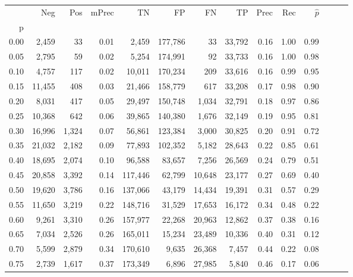 \begin{tabular}{rrrrrrrrrrrrrr}
\toprule
{} &     Neg &    Pos & mPrec &       TN &       FP &      FN &      TP &  Prec &   Rec & $\hat{p}$ \\
p    &         &        &       &          &          &         &         &       &       &           \\
\midrule
0.00 &   2,459 &     33 &  0.01 &    2,459 &  177,786 &      33 &  33,792 &  0.16 &  1.00 &      0.99 \\
0.05 &   2,795 &     59 &  0.02 &    5,254 &  174,991 &      92 &  33,733 &  0.16 &  1.00 &      0.98 \\
0.10 &   4,757 &    117 &  0.02 &   10,011 &  170,234 &     209 &  33,616 &  0.16 &  0.99 &      0.95 \\
0.15 &  11,455 &    408 &  0.03 &   21,466 &  158,779 &     617 &  33,208 &  0.17 &  0.98 &      0.90 \\
0.20 &   8,031 &    417 &  0.05 &   29,497 &  150,748 &   1,034 &  32,791 &  0.18 &  0.97 &      0.86 \\
0.25 &  10,368 &    642 &  0.06 &   39,865 &  140,380 &   1,676 &  32,149 &  0.19 &  0.95 &      0.81 \\
0.30 &  16,996 &  1,324 &  0.07 &   56,861 &  123,384 &   3,000 &  30,825 &  0.20 &  0.91 &      0.72 \\
0.35 &  21,032 &  2,182 &  0.09 &   77,893 &  102,352 &   5,182 &  28,643 &  0.22 &  0.85 &      0.61 \\
0.40 &  18,695 &  2,074 &  0.10 &   96,588 &   83,657 &   7,256 &  26,569 &  0.24 &  0.79 &      0.51 \\
0.45 &  20,858 &  3,392 &  0.14 &  117,446 &   62,799 &  10,648 &  23,177 &  0.27 &  0.69 &      0.40 \\
0.50 &  19,620 &  3,786 &  0.16 &  137,066 &   43,179 &  14,434 &  19,391 &  0.31 &  0.57 &      0.29 \\
0.55 &  11,650 &  3,219 &  0.22 &  148,716 &   31,529 &  17,653 &  16,172 &  0.34 &  0.48 &      0.22 \\
0.60 &   9,261 &  3,310 &  0.26 &  157,977 &   22,268 &  20,963 &  12,862 &  0.37 &  0.38 &      0.16 \\
0.65 &   7,034 &  2,526 &  0.26 &  165,011 &   15,234 &  23,489 &  10,336 &  0.40 &  0.31 &      0.12 \\
0.70 &   5,599 &  2,879 &  0.34 &  170,610 &    9,635 &  26,368 &   7,457 &  0.44 &  0.22 &      0.08 \\
0.75 &   2,739 &  1,617 &  0.37 &  173,349 &    6,896 &  27,985 &   5,840 &  0.46 &  0.17 &      0.06 \\

\end{tabular}

